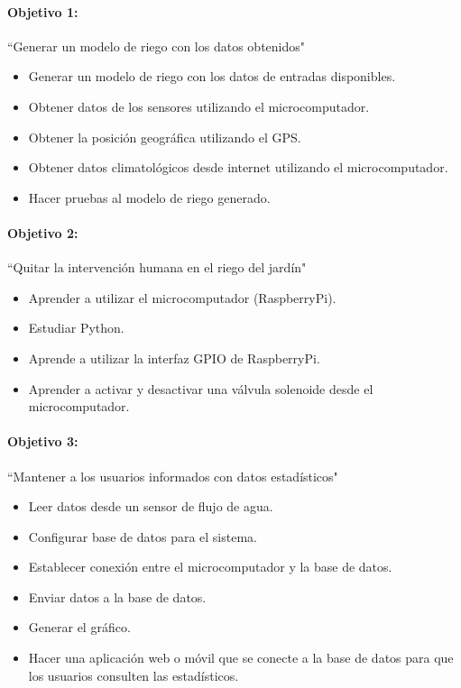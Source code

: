 \documentclass[11pt,letterpaper]{article}
\begin{document}
\paragraph{Objetivo 1:} ``Generar un modelo de riego con los datos obtenidos"\\
\begin{itemize}
\item Generar un modelo de riego con los datos de entradas disponibles.
\item Obtener datos de los sensores utilizando el microcomputador.
\item Obtener la posición geográfica utilizando el GPS.
\item Obtener datos climatológicos desde internet utilizando el microcomputador.
\item Hacer pruebas al modelo de riego generado.
\end{itemize}

\paragraph{Objetivo 2:} ``Quitar la intervención humana en el riego del jardín"\\
\begin{itemize}
\item Aprender a utilizar el microcomputador (RaspberryPi).
\item Estudiar Python.
\item Aprende a utilizar la interfaz GPIO de RaspberryPi.
\item Aprender a activar y desactivar una válvula solenoide desde el microcomputador.
\end{itemize}

\paragraph{Objetivo 3:} ``Mantener a los usuarios informados con datos estadísticos"\\
\begin{itemize}
\item Leer datos desde un sensor de flujo de agua.
\item Configurar base de datos para el sistema.
\item Establecer conexión entre el microcomputador y la base de datos.
\item Enviar datos a la base de datos.
\item Generar el gráfico.
\item Hacer una aplicación web o móvil que se conecte a la base de datos para que los usuarios consulten las estadísticos.
\end{itemize}
\end{document}
